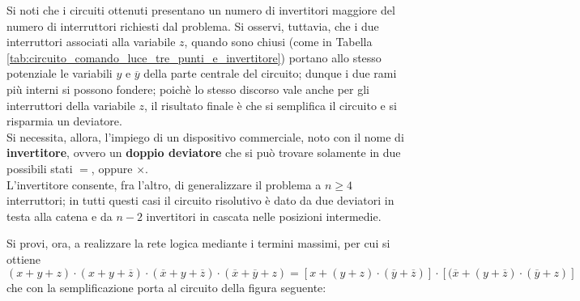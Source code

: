 \documentclass[a4paper]{extarticle}
\begin{document}
Si noti che i circuiti ottenuti presentano un numero di invertitori maggiore del numero di interruttori richiesti dal problema. Si osservi, tuttavia, che i due interruttori associati alla variabile $z$, quando sono chiusi (come in Tabella \ref{tab:circuito_comando_luce_tre_punti_e_invertitore}) portano allo
stesso potenziale le variabili $y$ e $\overline{y}$ della parte centrale del circuito; dunque i due rami più interni si possono fondere; poichè lo stesso discorso vale anche per gli interruttori della variabile $z$, il risultato finale è che si semplifica il circuito e si risparmia un deviatore.\\
Si necessita, allora, l'impiego di un dispositivo commerciale, noto con il nome di \textbf{invertitore}, ovvero un \textbf{doppio deviatore} che si può trovare solamente in due possibili stati \(=\), oppure \(\times\).\\
L'invertitore consente, fra l’altro, di generalizzare il problema a \(n \geq 4\) interruttori; in tutti questi casi il circuito risolutivo è dato da due deviatori in testa alla catena e da \(n - 2\) invertitori in cascata nelle posizioni intermedie.

\vspace{1em}
\noindent
Si provi, ora, a realizzare la rete logica mediante i termini massimi, per cui si ottiene
\[(x + y + z) \cdot (x + y + \overline{z}) \cdot (\overline{x} + y + \overline{z}) \cdot (\overline{x} + \overline{y} + z) = [x + (y +z) \cdot (\overline{y} + \overline{z})] \cdot [(\overline{x} + (y + \overline{z}) \cdot (\overline{y} + z)]\]
che con la semplificazione porta al circuito della figura seguente:
\end{document}
